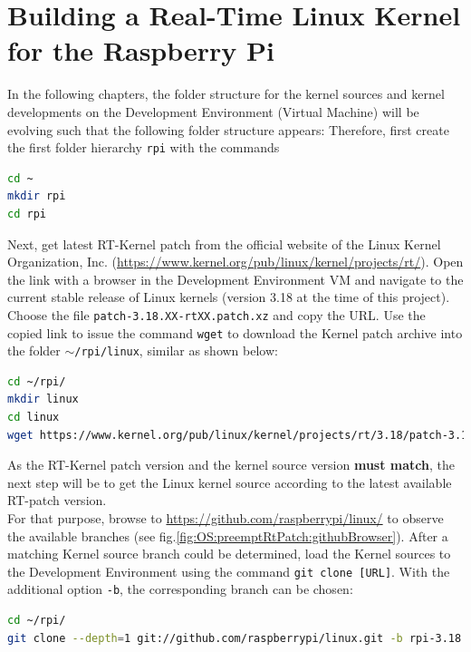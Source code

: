 \section[Building a Real-Time Linux Kernel]{Building a Real-Time Linux Kernel for the Raspberry Pi}
\label{sec:OS:preemptRtPatch}
In the following chapters, the folder structure for the kernel sources and kernel developments on the Development Environment (Virtual Machine) will be evolving such that the following folder structure appears:
Therefore, first create the first folder hierarchy \texttt{rpi} with the commands
\begin{lstlisting}[language=bash,otherkeywords={mkdir,cd,dd,sudo}]
cd ~
mkdir rpi
cd rpi
\end{lstlisting}

Next, get latest RT-Kernel patch from the official website of the Linux Kernel Organization, Inc. (\url{https://www.kernel.org/pub/linux/kernel/projects/rt/}). Open the link with a browser in the Development Environment VM and navigate to the current stable release of Linux kernels (version 3.18 at the time of this project). Choose the file \texttt{patch-3.18.XX-rtXX.patch.xz} and copy the URL. Use the copied link to issue the command \texttt{wget} to download the Kernel patch archive into the folder \texttt{$\sim$/rpi/linux}, similar as shown below:
\begin{lstlisting}[language=bash,otherkeywords={mkdir,wget,xcat,dd,sudo}]
cd ~/rpi/
mkdir linux
cd linux
wget https://www.kernel.org/pub/linux/kernel/projects/rt/3.18/patch-3.18.16-rt13.patch.xz
\end{lstlisting}

As the RT-Kernel patch version and the kernel source version \textbf{must match}, the next step will be to get the Linux kernel source according to the latest available RT-patch version.\\
For that purpose, browse to \url{https://github.com/raspberrypi/linux/} to observe the available branches (see fig.\ref{fig:OS:preemptRtPatch:githubBrowser}). After a matching Kernel source branch could be determined, load the Kernel sources to the Development Environment using the command \texttt{git clone [URL]}. With the additional option \texttt{-b}, the corresponding branch can be chosen:
\begin{lstlisting}[language=bash,otherkeywords={cd,dd,sudo}]
cd ~/rpi/
git clone --depth=1 git://github.com/raspberrypi/linux.git -b rpi-3.18.y
\end{lstlisting}

